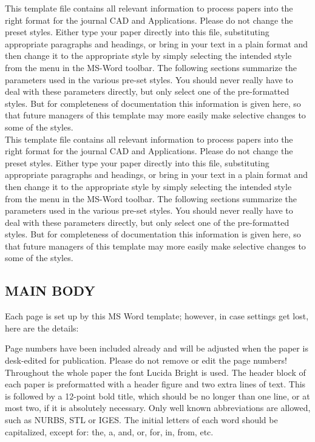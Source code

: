 \documentclass[9pt,a4paper]{article}
\begin{document}
This template file contains all relevant information to process papers into the right format for the journal CAD and Applications. Please do not change the preset styles. Either type your paper directly into this file, substituting appropriate paragraphs and headings, or bring in your text in a plain format and then change it to the appropriate style by simply selecting the intended style from the menu in the MS-Word toolbar.
The following sections summarize the parameters used in the various pre-set styles. You should never really have to deal with these parameters directly, but only select one of the pre-formatted styles. But for completeness of documentation this information is given here, so that future managers of this template may more easily make selective changes to some of the styles.\\
This template file contains all relevant information to process papers into the right format for the journal CAD and Applications. Please do not change the preset styles. Either type your paper directly into this file, substituting appropriate paragraphs and headings, or bring in your text in a plain format and then change it to the appropriate style by simply selecting the intended style from the menu in the MS-Word toolbar.
The following sections summarize the parameters used in the various pre-set styles. You should never really have to deal with these parameters directly, but only select one of the pre-formatted styles. But for completeness of documentation this information is given here, so that future managers of this template may more easily make selective changes to some of the styles.



\subsection{MAIN BODY}
\label{definitions}
Each page is set up by this MS Word template; however, in case settings get lost, here are the details:

Page numbers have been included already and will be adjusted when the paper is desk-edited for publication. Please do not remove or edit the page numbers!
Throughout the whole paper the font Lucida Bright is used. The header block of each paper is preformatted with a header figure and two extra lines of text. This is followed by a 12-point bold title, which should be no longer than one line, or at most two, if it is absolutely necessary. Only well known abbreviations are allowed, such as NURBS, STL or IGES. The initial letters of each word should be capitalized, except for: the, a, and, or, for, in, from, etc.
\end{document}
